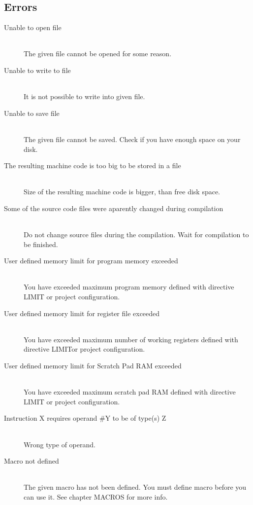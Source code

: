    \subsection{Errors}
        \begin{description}
            \item[Unable to open file]~\\
                The given file cannot be opened for some reason.
            \item[Unable to write to file]~\\
                It is not possible to write into given file.
            \item[Unable to save file]~\\
                The given file cannot be saved. Check if you have enough space on your disk.
            \item[The resulting machine code is too big to be stored in a file]~\\
                Size of the resulting machine code is bigger, than free disk space.
            \item[Some of the source code files were aparently changed during compilation]~\\
                Do not change source files during the compilation. Wait for compilation to be finished.
            \item[User defined memory limit for program memory exceeded]~\\
                You have exceeded maximum program memory defined with directive LIMIT or project configuration.
            \item[User defined memory limit for register file exceeded]~\\
                You have exceeded maximum number of working registers defined with directive LIMITor project configuration.
            \item[User defined memory limit for Scratch Pad RAM exceeded]~\\
                You have exceeded maximum scratch pad RAM defined with directive LIMIT or project configuration.
            \item[Instruction X requires operand \#Y to be of type(s) Z]~\\
                Wrong type of operand.
            \item[Macro not defined ]~\\
                The given macro has not been defined. You must define macro before you can use it. See chapter MACROS for more info.

\end{description}
